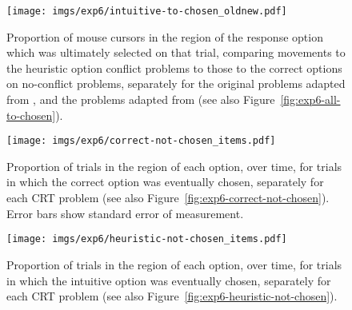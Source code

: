 \begin{figure}[h]
  \centering
  \texttt{[image: imgs/exp6/intuitive-to-chosen\_oldnew.pdf]}
  \caption[]{
    Proportion of mouse cursors in the region of
    the response option which was ultimately selected on that trial,
    comparing movements to the heuristic option conflict problems
    to those to the correct options on no-conflict problems,
    separately for the original problems adapted from \citet{Frederick2005},
    and the problems adapted from \citet{Primi2015}
    (see also Figure~\ref{fig:exp6-all-to-chosen}).
  }
\end{figure}




\begin{figure}[h]
  \centering
  \texttt{[image: imgs/exp6/correct-not-chosen\_items.pdf]}
  \caption[]{
    Proportion of trials in the region of each option, over time,
    for trials in which the correct option was eventually chosen,
    separately for each CRT problem
    (see also Figure~\ref{fig:exp6-correct-not-chosen}).
    Error bars show standard error of measurement.
  }
\end{figure}

\begin{figure}[h]
  \centering
  \texttt{[image: imgs/exp6/heuristic-not-chosen\_items.pdf]}
  \caption[]{
    Proportion of trials in the region of each option, over time,
    for trials in which the intuitive option was eventually chosen,
    separately for each CRT problem
    (see also Figure~\ref{fig:exp6-heuristic-not-chosen}).
  }
\end{figure}
